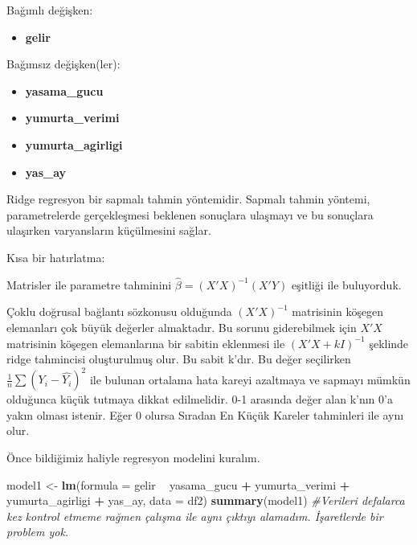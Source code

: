\documentclass[
]{book}
\newenvironment{Shaded}{\begin{snugshade}}{\end{snugshade}}
\newcommand{\CommentTok}[1]{\textcolor[rgb]{0.56,0.35,0.01}{\textit{#1}}}
\newcommand{\DataTypeTok}[1]{\textcolor[rgb]{0.13,0.29,0.53}{#1}}
\newcommand{\KeywordTok}[1]{\textcolor[rgb]{0.13,0.29,0.53}{\textbf{#1}}}
\newcommand{\NormalTok}[1]{#1}
\newcommand{\OperatorTok}[1]{\textcolor[rgb]{0.81,0.36,0.00}{\textbf{#1}}}
\newcommand{\StringTok}[1]{\textcolor[rgb]{0.31,0.60,0.02}{#1}}
\providecommand{\tightlist}{%
  \setlength{\itemsep}{0pt}\setlength{\parskip}{0pt}}
\begin{document}
Bağımlı değişken:

\begin{itemize}
\tightlist
\item
  \textbf{gelir}
\end{itemize}

Bağımsız değişken(ler):

\begin{itemize}
\item
  \textbf{yasama\_gucu}
\item
  \textbf{yumurta\_verimi}
\item
  \textbf{yumurta\_agirligi}
\item
  \textbf{yas\_ay}
\end{itemize}

Ridge regresyon bir sapmalı tahmin yöntemidir. Sapmalı tahmin yöntemi, parametrelerde gerçekleşmesi beklenen sonuçlara ulaşmayı ve bu sonuçlara ulaşırken varyansların küçülmesini sağlar.

Kısa bir hatırlatma:

Matrisler ile parametre tahminini \(\hat{\beta} = (X'X)^{-1} (X'Y)\) eşitliği ile buluyorduk.

Çoklu doğrusal bağlantı sözkonusu olduğunda \((X'X)^{-1}\) matrisinin köşegen elemanları çok büyük değerler almaktadır. Bu sorunu giderebilmek için \(X'X\) matrisinin köşegen elemanlarına bir sabitin eklenmesi ile \((X'X + kI)^{-1}\) şeklinde ridge tahmincisi oluşturulmuş olur. Bu sabit k'dır. Bu değer seçilirken \(\frac{1}{n}\sum (Y_i - \hat{Y_i})^2\) ile bulunan ortalama hata kareyi azaltmaya ve sapmayı mümkün olduğunca küçük tutmaya dikkat edilmelidir. 0-1 arasında değer alan k'nın 0'a yakın olması istenir. Eğer 0 olursa Sıradan En Küçük Kareler tahminleri ile aynı olur.

Önce bildiğimiz haliyle regresyon modelini kuralım.

\begin{Shaded}
\begin{Highlighting}[]
\NormalTok{model1 <-}\StringTok{ }\KeywordTok{lm}\NormalTok{(}\DataTypeTok{formula =}\NormalTok{ gelir }\OperatorTok{~}\StringTok{ }\NormalTok{yasama_gucu }\OperatorTok{+}\StringTok{ }\NormalTok{yumurta_verimi }\OperatorTok{+}\StringTok{ }\NormalTok{yumurta_agirligi }\OperatorTok{+}\StringTok{ }\NormalTok{yas_ay, }\DataTypeTok{data =}\NormalTok{ df2)}
\KeywordTok{summary}\NormalTok{(model1) }\CommentTok{#Verileri defalarca kez kontrol etmeme rağmen çalışma ile aynı çıktıyı alamadım. İşaretlerde bir problem yok.}
\end{Highlighting}
\end{Shaded}
\end{document}
